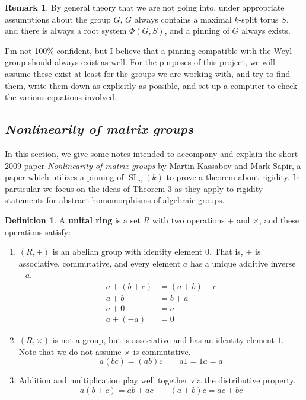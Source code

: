 \documentclass[12pt]{article}
\theoremstyle{definition}
\newtheorem{definition}[theorem]{Definition}
\newtheorem{remark}[theorem]{Remark}
\numberwithin{theorem}{subsection}
\newcommand{\tbf}{\textbf}
\DeclareMathOperator{\SL}{SL}
\begin{document}
\begin{remark}
By general theory that we are not going into, under appropriate assumptions about the group $G$, $G$ always contains a maximal $k$-split torus $S$, and there is always a root system $\Phi(G,S)$, and a pinning of $G$ always exists. 

I'm not 100\% confident, but I believe that a pinning compatible with the Weyl group should always exist as well. For the purposes of this project, we will assume these exist at least for the groups we are working with, and try to find them, write them down as explicitly as possible, and set up a computer to check the various equations involved.
\end{remark}

\subsection{\textit{Nonlinearity of matrix groups}}
\label{nonlinearity}

In this section, we give some notes intended to accompany and explain the short 2009 paper \textit{Nonlinearity of matrix groups} by Martin Kassabov and Mark Sapir, a paper which utilizes a pinning of $\SL_n(k)$ to prove a theorem about rigidity. In particular we focus on the ideas of Theorem 3 as they apply to rigidity statements for abstract homomorphisms of algebraic groups.

\begin{definition}
A \tbf{unital ring} is a set $R$ with two operations $+$ and $\times$, and these operations satisfy:
\begin{enumerate}
	\item $(R, +)$ is an abelian group with identity element $0$. That is, $+$ is associative, commutative, and every element $a$ has a unique additive inverse $-a$.
	\begin{align*}
		a + (b+c) &= (a+b) + c \\ 
		a+ b &= b+a \\
		a + 0 &= a \\
		a + (-a) &= 0
	\end{align*}
	\item $(R, \times)$ is not a group, but is associative and has an identity element $1$. Note that we do not assume $\times$ is commutative.
	\[
		a(bc) = (ab)c \qquad a1 = 1a = a
	\]
	\item Addition and multiplication play well together via the distributive property.
	\[
		a(b+c) = ab + ac \qquad (a+b)c = ac + bc
	\]
\end{enumerate}
\end{definition}
\end{document}
